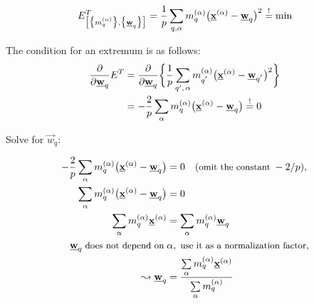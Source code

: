 \begin{frame}
\begin{equation}
E_{ \big[ \big\{ m_q^{(\alpha)} \big\}, \big\{ \vec{w}_q \big\} 
		\big] }^T = \frac{1}{p} \sum\limits_{q,\alpha} m_q^{(\alpha)}
		\big( \vec{x}^{(\alpha)} - \vec{w}_q \big)^2 \eqexcl \min
\end{equation}

The condition for an extremum is as follows:
\begin{align}
	\frac{\partial}{\partial \vec{w}_q} E^T
	&=
	\frac{\partial}{\partial \vec{w}_q} \bigg\{ \frac{1}{p} 
	\sum\limits_{q', \, \alpha} m_{q^{'}}^{(\alpha)} 
	\big( \vec{x}^{(\alpha)} - \vec{w}_{q^{'}} \big)^2 \bigg\} \\
	& = -\frac{2}{p} \sum\limits_{\alpha} m_q^{(\alpha)} 
		\big( \vec{x}^{(\alpha)} - \vec{w}_q \big) \eqexcl 0
\end{align}

\end{frame}
\begin{frame}

Solve for $\vec w_q$:


\begin{align}
 -\frac{2}{p} \sum\limits_{\alpha} m_q^{(\alpha)} 
		\big( \vec{x}^{(\alpha)} - \vec{w}_q \big) &= 0 \quad (\text{\small omit the constant}\; -2/p),\\
 \sum\limits_{\alpha} m_q^{(\alpha)} 
		\big( \vec{x}^{(\alpha)} - \vec{w}_q \big) &= 0\\
 \sum\limits_{\alpha} m_q^{(\alpha)} 
		\vec{x}^{(\alpha)} &= \sum\limits_{\alpha} m_q^{(\alpha)} \vec{w}_q \\
		\vec w_q \;\text{\small does not depend on}\; &\alpha, \;\text{\small use it as a normalization factor},\\
	\leadsto \vec{w}_q &= \frac{\sum\limits_{\alpha} m_q^{(\alpha)}
		\vec{x}^{(\alpha)}}{\sum\limits_{\alpha} m_q^{(\alpha)}}
\end{align}

\end{frame}
